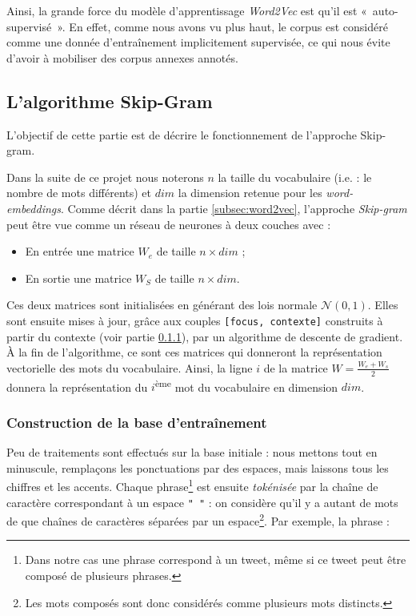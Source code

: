 \documentclass[11pt,french,french]{article}
\let\rmarkdownfootnote\footnote%
\def\footnote{\protect\rmarkdownfootnote}
\begin{document}
Ainsi, la grande force du modèle d'apprentissage \emph{Word2Vec} est qu'il est «~auto-supervisé~». En effet, comme nous avons vu plus haut, le corpus est considéré comme une donnée d'entraînement implicitement supervisée, ce qui nous évite d'avoir à mobiliser des corpus annexes annotés.

\hypertarget{sec:skipgram}{%
\subsection{L'algorithme Skip-Gram}\label{sec:skipgram}}

L'objectif de cette partie est de décrire le fonctionnement de l'approche Skip-gram.

Dans la suite de ce projet nous noterons \(n\) la taille du vocabulaire (i.e. : le nombre de mots différents) et \(dim\) la dimension retenue pour les \emph{word-embeddings}.
Comme décrit dans la partie \ref{subsec:word2vec}, l'approche \emph{Skip-gram} peut être vue comme un réseau de neurones à deux couches avec :

\begin{itemize}
\item
  En entrée une matrice \(W_e\) de taille \(n\times dim\) ;
\item
  En sortie une matrice \(W_S\) de taille \(n\times dim\).
\end{itemize}

Ces deux matrices sont initialisées en générant des lois normale \(\mathcal N(0,1)\). Elles sont ensuite mises à jour, grâce aux couples \texttt{{[}focus,\ contexte{]}} construits à partir du contexte (voir partie \ref{subsec:baseentrainement}), par un algorithme de descente de gradient.
À la fin de l'algorithme, ce sont ces matrices qui donneront la représentation vectorielle des mots du vocabulaire.
Ainsi, la ligne \(i\) de la matrice \(W=\frac{W_e+W_s}{2}\) donnera la représentation du \(i\)\textsuperscript{ème} mot du vocabulaire en dimension \(dim\).

\hypertarget{subsec:baseentrainement}{%
\subsubsection{Construction de la base d'entraînement}\label{subsec:baseentrainement}}

Peu de traitements sont effectués sur la base initiale : nous mettons tout en minuscule, remplaçons les ponctuations par des espaces, mais laissons tous les chiffres et les accents.
Chaque phrase\footnote{Dans notre cas une phrase correspond à un tweet, même si ce tweet peut être composé de plusieurs phrases.}
est ensuite \emph{tokénisée} par la chaîne de caractère correspondant à un espace \texttt{"\ "} : on considère qu'il y a autant de mots de que chaînes de caractères séparées par un espace\footnote{Les mots composés sont donc considérés comme plusieurs mots distincts.}. Par exemple, la phrase :
\end{document}
